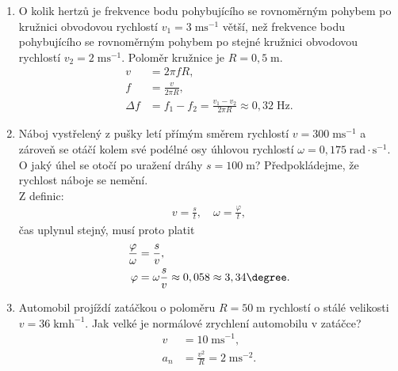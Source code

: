 \documentclass[11pt,a4paper]{article}
\begin{document}
\begin{enumerate}
            \item O kolik hertzů je frekvence bodu pohybujícího se rovnoměrným pohybem po kružnici obvodovou rychlostí $v_1 = 3 \; \mathrm{ms}^{-1}$ větší, než frekvence bodu pohybujícího se rovnoměrným pohybem po stejné kružnici obvodovou rychlostí $v_2 = 2 \; \mathrm{ms}^{-1}$. Poloměr kružnice je $R = 0,5 \; \mathrm m$.
            \begin{align*}
                v &= 2 \pi f R,
            \\
                f &= \frac{v}{2 \pi R},
            \\
                \Delta f &= f_1 - f_2 = \frac{v_1 - v_2}{2\pi R} \approx 0,32 \; \mathrm{Hz}.
            \end{align*}

            \item Náboj vystřelený z pušky letí přímým směrem rychlostí $v = 300 \; \mathrm{ms}^{-1}$ a zároveň se otáčí kolem své podélné osy úhlovou rychlostí $\omega = 0,175 \;\mathrm{rad}\cdot\mathrm{s}^{-1}$. O jaký úhel se otočí po uražení dráhy $s = 100 \;\mathrm m$? Předpokládejme, že rychlost náboje se nemění.\\
            Z definic:
            \begin{align*}
                v = \frac{s}{t}, \quad \omega = \frac{\varphi}{t},
            \end{align*}
            čas uplynul stejný, musí proto platit
            \begin{align*}
                \frac{\varphi}{\omega} &= \frac{s}{v},
            \\
                \varphi &= \omega \frac sv \approx 0,058 \approx 3,34 \degree.
            \end{align*}

            \item Automobil projíždí zatáčkou o poloměru $R = 50 \;\mathrm m$ rychlostí o stálé velikosti $ v = 36 \; \mathrm{kmh}^{-1}$. Jak velké je normálové zrychlení automobilu v zatáčce?
            \begin{align*}
                v &= 10 \; \mathrm{ms}^{-1},
            \\
                a_n &= \frac{v^2}{R} = 2 \;\mathrm{ms}^{-2}.
            \end{align*}
        \end{enumerate}
                
            

            

        
\end{document}
